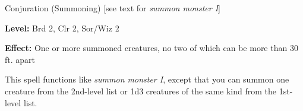 
Conjuration (Summoning) [see text for \textit{summon monster I}]

\textbf{Level:} Brd 2, Clr 2, Sor/Wiz 2

\textbf{Effect:} One or more summoned creatures, no two of which can be more than 
30 ft. apart

This spell functions like \textit{summon monster I}, except that you can summon 
one creature from the 2nd-level list or 1d3 creatures of the same kind from the 
1st-level list.

